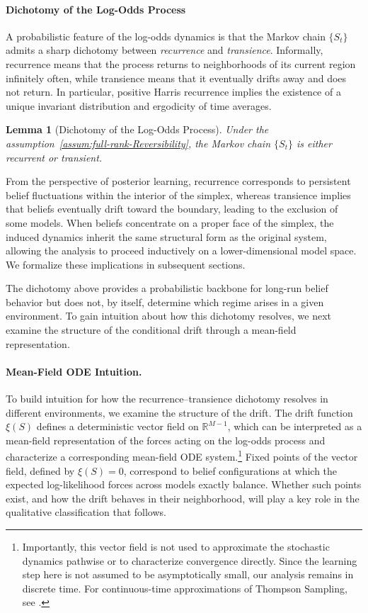 \documentclass[12pt]{article}
\newtheorem{lemma}{Lemma}
\begin{document}
\paragraph{Dichotomy of the Log-Odds Process}
A probabilistic feature of the log-odds dynamics is that the Markov chain $\{S_t\}$ admits a sharp dichotomy between \emph{recurrence} and \emph{transience}.
Informally, recurrence means that the process returns to neighborhoods of its current region infinitely often, while transience means that it eventually drifts away and does not return.
In particular, positive Harris recurrence implies the existence of a unique invariant distribution and ergodicity of time averages.

\begin{lemma}[Dichotomy of the Log-Odds Process]
\label{lemma:dichotomy-of-the-log-odds-process}
Under the assumption~\ref{assum:full-rank-Reversibility}, the Markov chain $\{S_t\}$ is either recurrent or transient.
\end{lemma}

From the perspective of posterior learning, recurrence corresponds to persistent belief fluctuations within the interior of the simplex, whereas transience implies that beliefs eventually drift toward the boundary, leading to the exclusion of some models. When beliefs concentrate on a proper face of the simplex, the induced dynamics inherit the same structural form as the original system, allowing the analysis to proceed inductively on a lower-dimensional model space. We formalize these implications in subsequent sections.

The dichotomy above provides a probabilistic backbone for long-run belief behavior but does not, by itself, determine which regime arises in a given environment.
To gain intuition about how this dichotomy resolves, we next examine the structure of the conditional drift through a mean-field representation.

\paragraph{Mean-Field ODE Intuition.}
To build intuition for how the recurrence--transience dichotomy resolves in different environments, we examine the structure of the drift.
The drift function $\xi(S)$ defines a deterministic vector field on $\mathbb{R}^{M-1}$, which can be interpreted as a mean-field representation of the forces acting on the log-odds process and characterize a corresponding mean-field ODE system.\footnote{Importantly, this vector field is not used to approximate the stochastic dynamics pathwise or to characterize convergence directly. Since the learning step here is not assumed to be asymptotically small, our analysis remains in discrete time. For continuous-time approximations of Thompson Sampling, see \citet{fanDiffusionApproximationsThompson2025}.} Fixed points of the vector field, defined by $\xi(S)=0$, correspond to belief configurations at which the expected log-likelihood forces across models exactly balance. Whether such points exist, and how the drift behaves in their neighborhood, will play a key role in the qualitative classification that follows.
\end{document}
